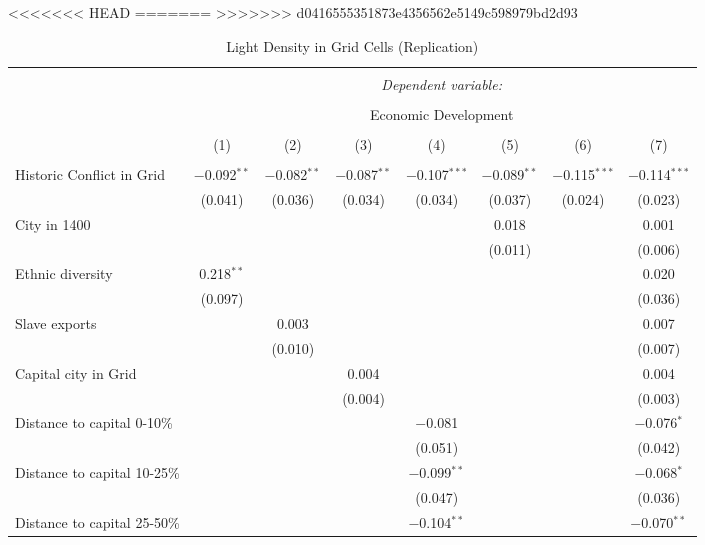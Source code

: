 
<<<<<<< HEAD
=======
>>>>>>> d0416555351873e4356562e5149c598979bd2d93
\begin{table}[!htbp] \centering 
  \caption{Light Density in Grid Cells (Replication)} 
  \label{} 
\footnotesize 
\begin{tabular}{@{\extracolsep{2pt}}lccccccc} 
\\[-1.8ex]\hline 
\hline \\[-1.8ex] 
 & \multicolumn{7}{c}{\textit{Dependent variable:}} \\ 
\cline{2-8} 
\\[-1.8ex] & \multicolumn{7}{c}{Economic Development} \\ 
\\[-1.8ex] & (1) & (2) & (3) & (4) & (5) & (6) & (7)\\ 
\hline \\[-1.8ex] 
 Historic Conflict in Grid & $-$0.092$^{**}$ & $-$0.082$^{**}$ & $-$0.087$^{**}$ & $-$0.107$^{***}$ & $-$0.089$^{**}$ & $-$0.115$^{***}$ & $-$0.114$^{***}$ \\ 
  & (0.041) & (0.036) & (0.034) & (0.034) & (0.037) & (0.024) & (0.023) \\ 
  City in 1400 &  &  &  &  & 0.018 &  & 0.001 \\ 
  &  &  &  &  & (0.011) &  & (0.006) \\ 
  Ethnic diversity & 0.218$^{**}$ &  &  &  &  &  & 0.020 \\ 
  & (0.097) &  &  &  &  &  & (0.036) \\ 
  Slave exports &  & 0.003 &  &  &  &  & 0.007 \\ 
  &  & (0.010) &  &  &  &  & (0.007) \\ 
  Capital city in Grid &  &  & 0.004 &  &  &  & 0.004 \\ 
  &  &  & (0.004) &  &  &  & (0.003) \\ 
  Distance to capital 0-10\% &  &  &  & $-$0.081 &  &  & $-$0.076$^{*}$ \\ 
  &  &  &  & (0.051) &  &  & (0.042) \\ 
  Distance to capital 10-25\% &  &  &  & $-$0.099$^{**}$ &  &  & $-$0.068$^{*}$ \\ 
  &  &  &  & (0.047) &  &  & (0.036) \\ 
  Distance to capital 25-50\% &  &  &  & $-$0.104$^{**}$ &  &  & $-$0.070$^{**}$ \\ 

\end{tabular}
\end{table}
